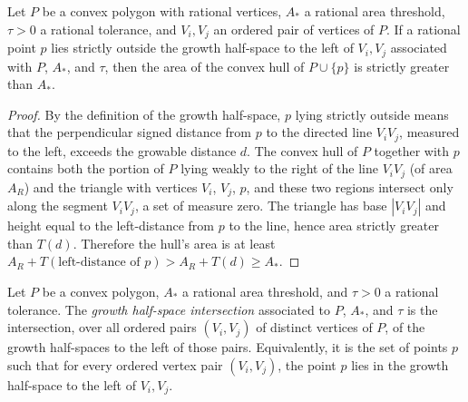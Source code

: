 \begin{lemma}
    \label{lem:threshold_violated_outside_growth_halfspace}
    Let $P$ be a convex polygon with rational vertices, $A_*$ a rational
    area threshold, $\tau > 0$ a rational tolerance, and $V_i, V_j$ an
    ordered pair of vertices of $P$. If a rational point $p$ lies
    strictly outside the growth half-space to the left of $V_i, V_j$
    associated with $P$, $A_*$, and $\tau$, then the area of the convex
    hull of $P \cup \{p\}$ is strictly greater than $A_*$.
\end{lemma}
\begin{proof}
    By the definition of the growth half-space, $p$ lying strictly
    outside means that the perpendicular signed distance from $p$ to the
    directed line $V_i V_j$, measured to the left, exceeds the growable
    distance $d$. The convex hull of $P$ together with $p$ contains both
    the portion of $P$ lying weakly to the right of the line $V_i V_j$
    (of area $A_R$) and the triangle with vertices $V_i$, $V_j$, $p$,
    and these two regions intersect only along the segment $V_i V_j$, a
    set of measure zero. The triangle has base $|V_i V_j|$ and height
    equal to the left-distance from $p$ to the line, hence area strictly
    greater than $T(d)$. Therefore the hull's area is at least
    $A_R + T(\text{left-distance of } p) > A_R + T(d) \ge A_*$.
\end{proof}

\begin{definition}
    \label{def:growthHalfspaceIntersection}
    Let $P$ be a convex polygon, $A_*$ a rational area threshold, and
    $\tau > 0$ a rational tolerance. The
    \emph{growth half-space intersection} associated to $P$, $A_*$, and
    $\tau$ is the intersection, over all ordered pairs $(V_i, V_j)$ of
    distinct vertices of $P$, of the growth half-spaces to the left of
    those pairs. Equivalently, it is the set of points $p$ such that for
    every ordered vertex pair $(V_i, V_j)$, the point $p$ lies in the
    growth half-space to the left of $V_i, V_j$.
\end{definition}

